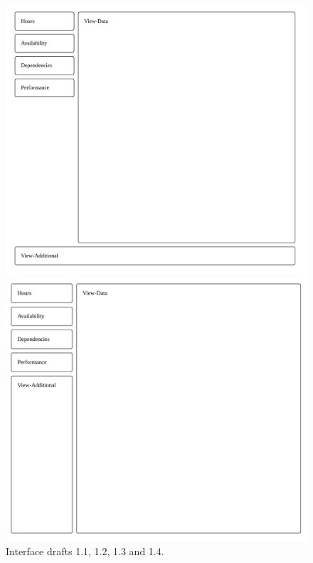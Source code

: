 \documentclass[nofilelist,dvipsnames]{cslthse-msc}
\begin{document}
\begin{figure}[h!]
\begin{minipage}{.49\textwidth}
            \includegraphics[width=\linewidth]{ui13.pdf}
          \end{minipage}
          \begin{minipage}{.49\textwidth}
            \includegraphics[width=\linewidth]{ui14.pdf}
          \end{minipage}
          \caption{Interface drafts 1.1, 1.2, 1.3 and 1.4.}
        \end{figure}
\end{document}
